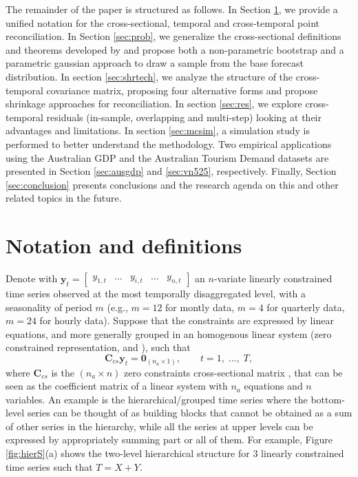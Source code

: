 \documentclass[a4paper,11pt]{article}
\newcommand{\yvet}{\bm{y}}
\newcommand{\Cvet}{\bm{C}}
\newcommand{\Zerovet}{\bm{0}}
\theoremstyle{definition}
\begin{document}
The remainder of the paper is structured as follows. 
In Section \ref{sec:not}, we provide a unified notation for the cross-sectional, temporal and cross-temporal point reconciliation. 
In Section \ref{sec:prob}, we generalize the cross-sectional definitions and theorems developed by \cite{panagiotelis2023} and propose both a non-parametric bootstrap and a parametric gaussian approach to draw a sample from the base forecast distribution.
In section \ref{sec:shrtech}, we analyze the structure of the cross-temporal covariance matrix, proposing four alternative forms and propose shrinkage approaches for reconciliation. 
In section \ref{sec:res}, we explore cross-temporal residuals (in-sample, overlapping and multi-step) looking at their advantages and limitations. 
In section \ref{sec:mcsim}, a simulation study is performed to better understand the methodology. 
Two empirical applications using the Australian GDP and the Australian Tourism Demand datasets are presented in Section \ref{sec:ausgdp} and \ref{sec:vn525}, respectively. 
Finally, Section \ref{sec:conclusion} presents conclusions and the research agenda on this and other related topics in the future.

\section{Notation and definitions}\label{sec:not}


Denote with $\yvet_t = \begin{bmatrix}
	y_{1,t} &
	\dots &
	y_{i,t} &
	\dots &
	y_{n,t}
\end{bmatrix}$ an $n$-variate linearly constrained time series observed at the most temporally disaggregated level, with a seasonality of period $m$ (e.g., $m = 12$ for montly data, $m = 4$ for quarterly data, $m = 24$ for hourly data). Suppose that the constraints are expressed by linear equations, and more generally grouped in an homogenous linear system (zero constrained representation, \citealp{wickramasuriya2019} and  \citealp{difonzo2023}), such that 
\begin{equation}
\label{eq:cs_con}
	\Cvet_{cs}\yvet_t = \Zerovet_{(n_a \times 1)}, \qquad t = 1, \;..., \;T,
\end{equation}
where $\Cvet_{cs}$ is the $(n_a \times n)$ zero constraints cross-sectional matrix , that can be seen as the coefficient matrix of a linear system with $n_a$ equations and $n$ variables. An example is the hierarchical/grouped time series where the bottom-level series can be thought of as building blocks that cannot be obtained as a sum of other series in the hierarchy, while all the series at upper levels can be expressed by appropriately summing part or all of them. For example, Figure \ref{fig:hierS}(a) shows the two-level hierarchical structure for 3 linearly constrained time series such that $T = X + Y$.
\end{document}
